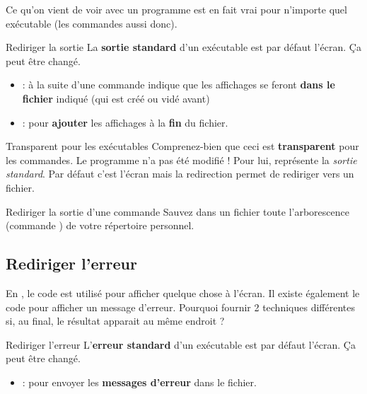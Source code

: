 \documentclass[a4paper,11pt]{style-esi/td}
\begin{document}
		Ce qu'on vient de voir avec un programme  est en fait
		vrai pour n'importe quel exécutable (les commandes aussi donc).

		\begin{theorie}{Rediriger la sortie}
			La \textbf{sortie standard} d'un exécutable est par défaut l'écran.
			\c Ca peut être changé. 
			\begin{itemize}
				\item {} :
					à la suite d'une commande indique que les affichages
					se feront \textbf{dans le fichier} indiqué (qui est créé ou vidé avant)
				\item {} : 
					pour \textbf{ajouter} les affichages à la \textbf{fin} du fichier.
			\end{itemize}
		\end{theorie}

		\begin{alerttbox}{Transparent pour les exécutables}
			Comprenez-bien que ceci est \textbf{transparent}
			pour les commandes.
			Le programme  n'a pas été modifié !
			Pour lui,  représente la \emph{sortie standard}.
			Par défaut c'est l'écran mais la redirection 
			permet de rediriger vers un fichier.
		\end{alerttbox}

		\begin{Exercice}{Rediriger la sortie d'une commande}
			Sauvez dans un fichier toute l'arborescence (commande )
			de votre répertoire personnel.
		\end{Exercice}

	\subsection{Rediriger l'erreur}
	
		En , le code 
		est utilisé pour afficher quelque chose à l'écran.
		Il existe également le code 
		pour afficher un message d'erreur.
		Pourquoi fournir 2 techniques différentes si, au final,
		le résultat apparait au même endroit ?

		\begin{theorie}{Rediriger l'erreur}
			L'\textbf{erreur standard} d'un exécutable est par défaut l'écran.
			\c Ca peut être changé. 
			\begin{itemize}
				\item {} : 
				pour envoyer les \textbf{messages d'erreur} dans le fichier.
			\end{itemize}
		\end{theorie}
\end{document}
